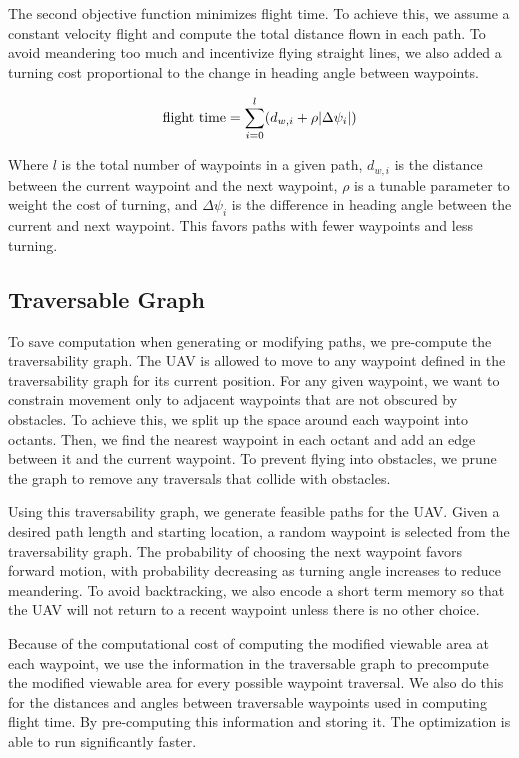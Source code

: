 \documentclass[letterpaper, 10 pt, conference]{ieeeconf}  %
\begin{document}
The second objective function minimizes flight time. To achieve this, we assume a constant velocity flight and compute the total distance flown in each path. To avoid meandering too much and incentivize flying straight lines, we also added a turning cost proportional to the change in heading angle between waypoints.

\begin{equation}%
    \text{flight time} = \sum_{i=0}^{l} (d_{w,i} + \rho\abs{\Delta \psi_i})
\end{equation}

Where $l$ is the total number of waypoints in a given path, $d_{w,i}$ is the distance between the current waypoint and the next waypoint, $\rho$ is a tunable parameter to weight the cost of turning, and $\Delta \psi_i$ is the difference in heading angle between the current and next waypoint. This favors paths with fewer waypoints and less turning.

\subsection{Traversable Graph}

To save computation when generating or modifying paths, we pre-compute the traversability graph. The UAV is allowed to move to any waypoint defined in the traversability graph for its current position. For any given waypoint, we want to constrain movement only to adjacent waypoints that are not obscured by obstacles. To achieve this, we split up the space around each waypoint into octants. Then, we find the nearest waypoint in each octant and add an edge between it and the current waypoint. To prevent flying into obstacles, we prune the graph to remove any traversals that collide with obstacles.

Using this traversability graph, we generate feasible paths for the UAV. Given a desired path length and starting location, a random waypoint is selected from the traversability graph. The probability of choosing the next waypoint favors forward motion, with probability decreasing as turning angle increases to reduce meandering. To avoid backtracking, we also encode a short term memory so that the UAV will not return to a recent waypoint unless there is no other choice.

Because of the computational cost of computing the modified viewable area at each waypoint, we use the information in the traversable graph to precompute the modified viewable area for every possible waypoint traversal. We also do this for the distances and angles between traversable waypoints used in computing flight time. By pre-computing this information and storing it. The optimization is able to run significantly faster.
\end{document}
